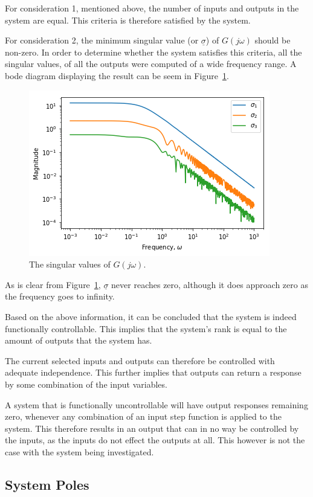 For consideration 1, mentioned above, the number of inputs and outputs in the system are equal. This criteria is therefore satisfied by the system.

For consideration 2, the minimum singular value (or $\underline{\sigma}$) of $G(j\omega)$ should be non-zero. In order to determine whether the system satisfies this criteria, all the singular values, of all the outputs were computed of a wide frequency range. A bode diagram displaying the result can be seem in Figure~\ref{fig:gs-singular-values}.

\begin{figure}
	\centering
	\includegraphics[width=0.7\linewidth]{"Figures/G(s) Singular Values"}
	\caption{The singular values of $G(j\omega)$.}
	\label{fig:gs-singular-values}
\end{figure}

As is clear from Figure~\ref{fig:gs-singular-values}, $\underline{\sigma}$ never reaches zero, although it does approach zero as the frequency goes to infinity. 

Based on the above information, it can be concluded that the system is indeed functionally controllable. This implies that the system's rank is equal to the amount of outputs that the system has.

The current selected inputs and outputs can therefore be controlled with adequate independence. This further implies that outputs can return a response by some combination of the input variables.

A system that is functionally uncontrollable will have output responses remaining zero, whenever any combination of an input step function is applied to the system. This therefore results in an output that can in no way be controlled by the inputs, as the inputs do not effect the outputs at all. This however is not the case with the system being investigated.

\subsection{System Poles}
\label{sec:System Poles}
